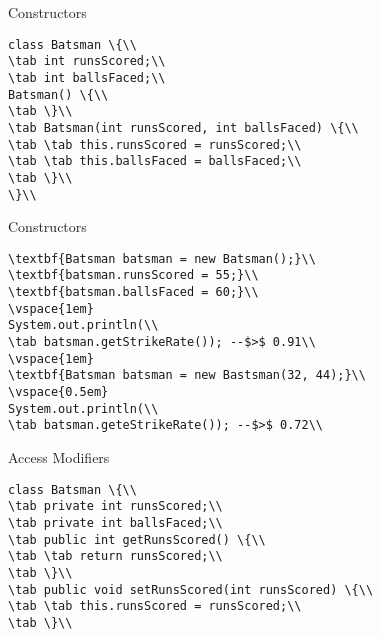 \documentclass[aspectratio=169,14pt,usenames,dvipsnames]{beamer}
\newcommand\tab[1][1cm]{\hspace*{#1}}
\begin{document}
\begin{frame}{Constructors}
\begin{lstlisting}
class Batsman \{\\
\tab int runsScored;\\
\tab int ballsFaced;\\
Batsman() \{\\
\tab \}\\
\tab Batsman(int runsScored, int ballsFaced) \{\\
\tab \tab this.runsScored = runsScored;\\
\tab \tab this.ballsFaced = ballsFaced;\\
\tab \}\\
\}\\
\end{lstlisting}
\end{frame}

\begin{frame}{Constructors}
\begin{lstlisting}
\textbf{Batsman batsman = new Batsman();}\\
\textbf{batsman.runsScored = 55;}\\
\textbf{batsman.ballsFaced = 60;}\\
\vspace{1em}
System.out.println(\\
\tab batsman.getStrikeRate()); --$>$ 0.91\\
\vspace{1em}
\textbf{Batsman batsman = new Bastsman(32, 44);}\\
\vspace{0.5em}
System.out.println(\\
\tab batsman.geteStrikeRate()); --$>$ 0.72\\
\end{lstlisting}
\end{frame}


\begin{frame}{Access Modifiers}
\begin{lstlisting}
class Batsman \{\\
\tab private int runsScored;\\
\tab private int ballsFaced;\\
\tab public int getRunsScored() \{\\
\tab \tab return runsScored;\\
\tab \}\\
\tab public void setRunsScored(int runsScored) \{\\
\tab \tab this.runsScored = runsScored;\\
\tab \}\\
\end{lstlisting}
\end{frame}
\end{document}

